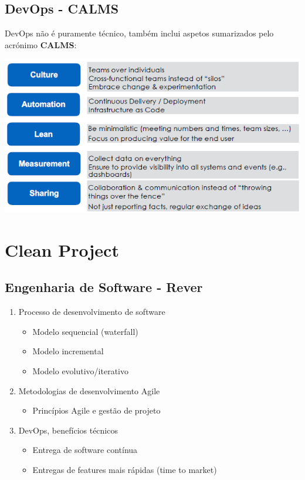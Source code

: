 \documentclass{article}
\begin{document}
\pagebreak

\subsection{DevOps - CALMS}

DevOps não é puramente técnico, também inclui aspetos sumarizados
pelo acrónimo \textbf{CALMS}:

\begin{center}
  \includegraphics[scale=0.6]{45}
\end{center}

\section{Clean Project}

\subsection{Engenharia de Software - Rever}

\begin{enumerate}
  \item Processo de desenvolvimento de software
  \begin{itemize}
    \item Modelo sequencial (waterfall)
    \item Modelo incremental
    \item Modelo evolutivo/iterativo
  \end{itemize}

  \item Metodologias de desenvolvimento Agile
  \begin{itemize}
    \item Princípios Agile e gestão de projeto
  \end{itemize}

  \item DevOps, benefícios técnicos
  \begin{itemize}
    \item Entrega de software contínua
    \item Entregas de features mais rápidas (time to market)
  \end{itemize}
\end{enumerate}
\end{document}
